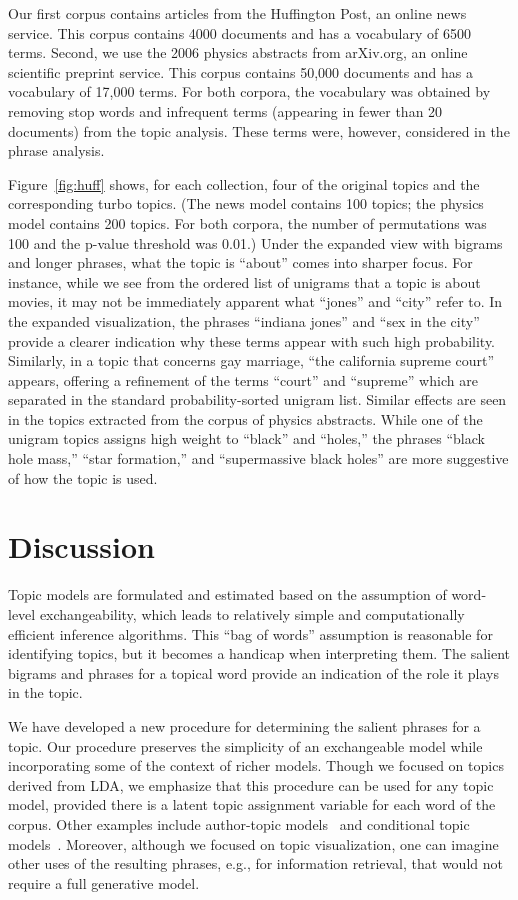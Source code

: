 \documentclass[11pt]{article}
\begin{document}
Our first corpus contains articles from the Huffington Post, an online
news service.  This corpus contains 4000 documents and has a
vocabulary of 6500 terms.  Second, we use the 2006 physics abstracts
from arXiv.org, an online scientific preprint service.  This corpus
contains 50,000 documents and has a vocabulary of 17,000 terms.  For
both corpora, the vocabulary was obtained by removing stop words and
infrequent terms (appearing in fewer than 20 documents) from the topic
analysis.  These terms were, however, considered in the phrase
analysis.

Figure~\ref{fig:huff} shows, for each collection, four of the original
topics and the corresponding turbo topics.  (The news model contains
100 topics; the physics model contains 200 topics.  For both corpora,
the number of permutations was 100 and the p-value threshold was
0.01.)  Under the expanded view with bigrams and longer phrases, what
the topic is ``about'' comes into sharper focus.  For instance, while
we see from the ordered list of unigrams that a topic is about movies,
it may not be immediately apparent what ``jones'' and ``city'' refer
to.  In the expanded visualization, the phrases ``indiana jones'' and
``sex in the city'' provide a clearer indication why these terms
appear with such high probability.  Similarly, in a topic that
concerns gay marriage, ``the california supreme court'' appears,
offering a refinement of the terms ``court'' and ``supreme'' which are
separated in the standard probability-sorted unigram list.  Similar
effects are seen in the topics extracted from the corpus of physics
abstracts.  While one of the unigram topics assigns high weight to
``black'' and ``holes,'' the phrases ``black hole mass,'' ``star
formation,'' and ``supermassive black holes'' are more suggestive of
how the topic is used.

\section{Discussion}

Topic models are formulated and estimated based on the assumption of
word-level exchangeability, which leads to relatively simple and
computationally efficient inference algorithms.  This ``bag of words''
assumption is reasonable for identifying topics, but it becomes a
handicap when interpreting them.  The salient bigrams and phrases for
a topical word provide an indication of the role it plays in the
topic.

We have developed a new procedure for determining the salient phrases
for a topic.  Our procedure preserves the simplicity of an
exchangeable model while incorporating some of the context of richer
models.  Though we focused on topics derived from LDA, we emphasize
that this procedure can be used for any topic model, provided there is
a latent topic assignment variable for each word of the corpus.  Other
examples include author-topic models~\citep{Rosen-Zvi:2004} and
conditional topic models~\citep{Mimno:2008}.  Moreover, although we
focused on topic visualization, one can imagine other uses of the
resulting phrases, e.g., for information retrieval, that would not
require a full generative model.
\end{document}
